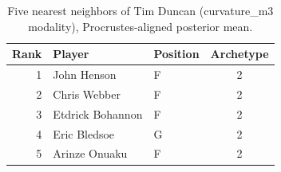 \begin{table}[htbp]
  \centering\small
  \begin{tabular}{rllc}
    \toprule
    Rank & Player & Position & Archetype \\
    \midrule
    1 & John Henson & F & 2 \\
    2 & Chris Webber & F & 2 \\
    3 & Etdrick Bohannon & F & 2 \\
    4 & Eric Bledsoe & G & 2 \\
    5 & Arinze Onuaku & F & 2 \\
    \bottomrule
  \end{tabular}
  \caption{Five nearest neighbors of Tim Duncan (curvature_m3 modality), Procrustes-aligned posterior mean.}
  \label{tab:Tim_Duncan_neighbors_curvature_m3}
\end{table}


